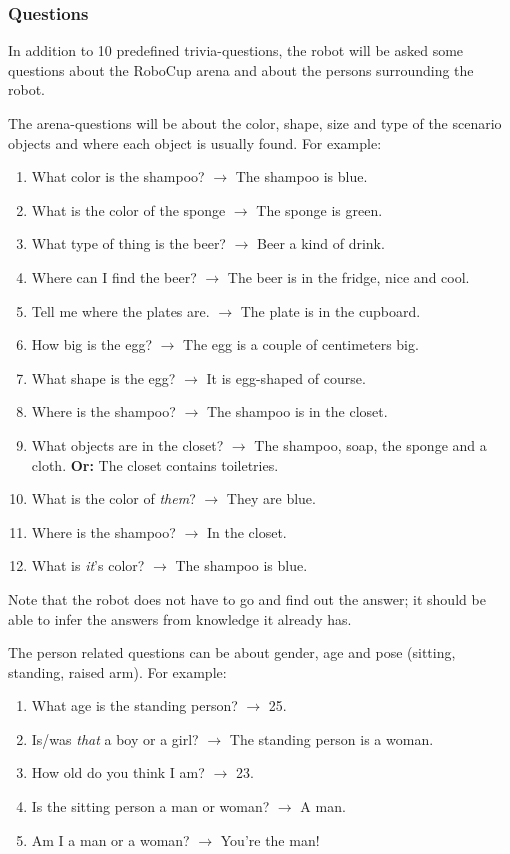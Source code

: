 \subsubsection{Questions}
In addition to 10 predefined trivia-questions, the robot will be asked some questions about the RoboCup arena and about the persons surrounding the robot. 

The arena-questions will be about the color, shape, size and type of the scenario objects  and where each object is usually found. 
For example:
\begin{enumerate}
 \item What color is the shampoo? $\rightarrow$ The shampoo is blue.
 \item What is the color of the sponge $\rightarrow$ The sponge is green.
 \item What type of thing is the beer? $\rightarrow$ Beer a kind of drink. 
 \item Where can I find the beer? $\rightarrow$ The beer is in the fridge, nice and cool. 
 \item Tell me where the plates are. $\rightarrow$ The plate is in the cupboard. 
 \item How big is the egg? $\rightarrow$ The egg is a couple of centimeters big.
 \item What shape is the egg? $\rightarrow$ It is egg-shaped of course. 
 \item Where is the shampoo? $\rightarrow$ The shampoo is in the closet. 
 \item What objects are in the closet? $\rightarrow$ The shampoo, soap, the sponge and a cloth. \textbf{Or:} The closet contains toiletries.
 \item What is the color of \textit{them}? $\rightarrow$ They are blue. 
 \item Where is the shampoo? $\rightarrow$ In the closet. 
 \item What is \textit{it}'s color? $\rightarrow$ The shampoo is blue. 
\end{enumerate}
Note that the robot does not have to go and find out the answer; it should be able to infer the answers from knowledge it already has. 

The person related questions can be about gender, age and pose (sitting, standing, raised arm).
For example: 
\begin{enumerate}
 \item What age is the standing person? $\rightarrow$ 25.
 \item Is/was \textit{that} a boy or a girl? $\rightarrow$ The standing person is a woman. 
 \item How old do you think I am? $\rightarrow$ 23.
 \item Is the sitting person a man or woman? $\rightarrow$ A man.
 \item Am I a man or a woman? $\rightarrow$ You're the man!
\end{enumerate}

